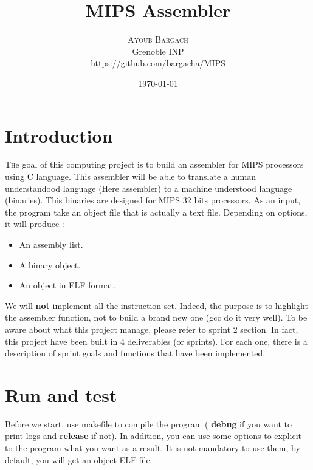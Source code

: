 \documentclass[twoside,twocolumn]{article}
\title{MIPS Assembler} %
\author{%
\textsc{Ayoub Bargach} \\[1ex] %
\normalsize Grenoble INP \\ %
\normalsize https://github.com/bargacha/MIPS %
}
\date{\today} %
\begin{document}
\maketitle


\section{Introduction}

\lettrine[nindent=0em,lines=3]{T} he goal of this computing project is to build an assembler for MIPS processors using C language. This assembler will be able to translate a human understandood language (Here assembler) to a machine understood language (binaries). This binaries are designed for MIPS 32 bits processors. As an input, the program take an object file that is actually a text file. Depending on options, it will produce :

\begin{itemize}

  \item An assembly list.
  \item A binary object.
  \item An object in ELF format.

\end{itemize}

We will \textbf{not} implement all the instruction set. Indeed, the purpose is to highlight the assembler function, not to build a brand new one (gcc do it very well). To be aware about what this project manage, please refer to sprint 2 section. In fact, this project have been built in 4 deliverables (or sprints). For each one, there is a description of sprint goals and functions that have been implemented.




\section{Run and test}

Before we start, use makefile to compile the program (\textbf{ debug } if you want to print logs and \textbf{ release } if not). In addition, you can use some options to explicit to the program what you want as a result. It is not mandatory to use them, by default, you will get an object ELF file.
\end{document}
